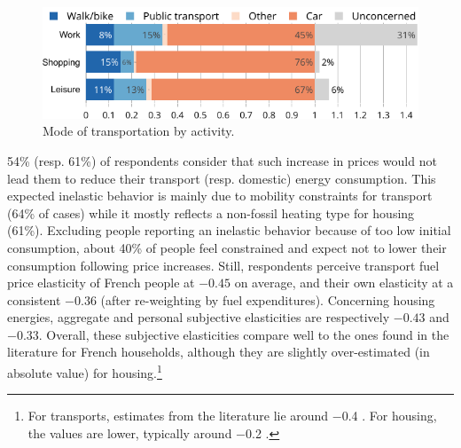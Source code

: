 \documentclass[english,5p,authoryear]{elsarticle}
\begin{document}
\begin{figure}[b]
\centering
\includegraphics[width=\columnwidth]{Images/transports_use_trim.png}
\caption{Mode of transportation by activity.}
\label{fig:transports_use}
\end{figure}

54\% (resp. 61\%) of respondents consider that such increase in prices would not lead them to reduce their transport (resp. domestic) energy consumption. This expected inelastic behavior is mainly due to mobility constraints for transport (64\% of cases) while it mostly reflects a non-fossil heating type for housing (61\%). Excluding people reporting an inelastic behavior because of too low initial consumption, about 40\% of people feel constrained and expect not to lower their consumption following price increases. Still, respondents perceive transport fuel price elasticity of French people at $-0.45$ on average, and their own elasticity at a consistent $-0.36$ (after re-weighting by fuel expenditures). Concerning housing energies, aggregate and personal subjective elasticities are respectively $-0.43$ and $-0.33$. Overall, these subjective elasticities compare well to the ones found in the literature for French households, although they are slightly over-estimated (in absolute value) for housing.\footnote{For transports, estimates from the literature lie around $-$0.4 \citep{clerc_marcus,bureau_distributional_2011,douenne_vertical_2018}. For housing, the values are lower, typically around $-$0.2 \citep{douenne_vertical_2018,clerc_marcus}.}


\end{document}
